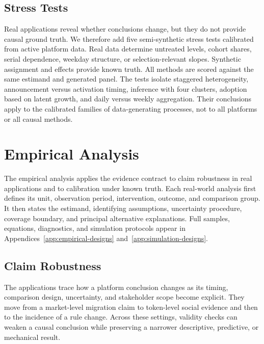 \documentclass{article}
\begin{document}
\subsection{Stress Tests}

Real applications reveal whether conclusions change, but they do not provide causal ground truth. We therefore add five semi-synthetic stress tests calibrated from active platform data. Real data determine untreated levels, cohort shares, serial dependence, weekday structure, or selection-relevant slopes. Synthetic assignment and effects provide known truth. All methods are scored against the same estimand and generated panel. The tests isolate staggered heterogeneity, announcement versus activation timing, inference with four clusters, adoption based on latent growth, and daily versus weekly aggregation. Their conclusions apply to the calibrated families of data-generating processes, not to all platforms or all causal methods.

\section{Empirical Analysis}
\label{sec:empirical}

The empirical analysis applies the evidence contract to claim robustness in real applications and to calibration under known truth. Each real-world analysis first defines its unit, observation period, intervention, outcome, and comparison group. It then states the estimand, identifying assumptions, uncertainty procedure, coverage boundary, and principal alternative explanations. Full samples, equations, diagnostics, and simulation protocols appear in Appendices~\ref{app:empirical-designs} and~\ref{app:simulation-designs}.

\subsection{Claim Robustness}
\label{sec:claim-robustness}

The applications trace how a platform conclusion changes as its timing, comparison design, uncertainty, and stakeholder scope become explicit. They move from a market-level migration claim to token-level social evidence and then to the incidence of a rule change. Across these settings, validity checks can weaken a causal conclusion while preserving a narrower descriptive, predictive, or mechanical result.
\end{document}
